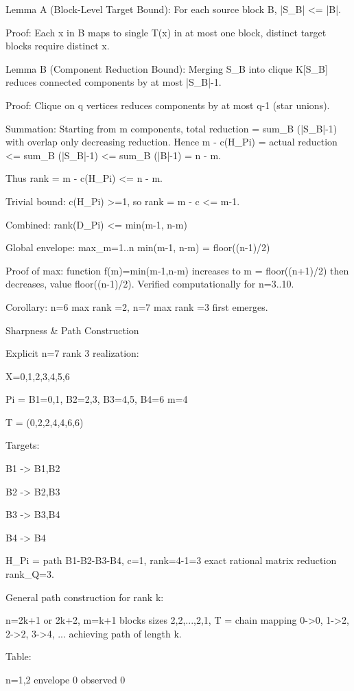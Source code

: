 Lemma A (Block-Level Target Bound): For each source block B, |S_B| <= |B|.

Proof: Each x in B maps to single T(x) in at most one block, distinct target blocks require distinct x.


Lemma B (Component Reduction Bound): Merging S_B into clique K[S_B] reduces connected components by at most |S_B|-1.

Proof: Clique on q vertices reduces components by at most q-1 (star unions).


Summation: Starting from m components, total reduction = sum_B (|S_B|-1) with overlap only decreasing reduction. Hence m - c(H_Pi) = actual reduction <= sum_B (|S_B|-1) <= sum_B (|B|-1) = n - m.


Thus rank = m - c(H_Pi) <= n - m.


Trivial bound: c(H_Pi) >=1, so rank = m - c <= m-1.


Combined: rank(D_Pi) <= min(m-1, n-m)


Global envelope: max_{m=1..n} min(m-1, n-m) = floor((n-1)/2)


Proof of max: function f(m)=min(m-1,n-m) increases to m = floor((n+1)/2) then decreases, value floor((n-1)/2). Verified computationally for n=3..10.


Corollary: n=6 max rank =2, n=7 max rank =3 first emerges.




Sharpness & Path Construction

Explicit n=7 rank 3 realization:




X={0,1,2,3,4,5,6}

Pi = {B1={0,1}, B2={2,3}, B3={4,5}, B4={6}} m=4

T = (0,2,2,4,4,6,6)


Targets:

B1 -> {B1,B2}

B2 -> {B2,B3}

B3 -> {B3,B4}

B4 -> {B4}


H_Pi = path B1-B2-B3-B4, c=1, rank=4-1=3 exact rational matrix reduction rank_Q=3.


General path construction for rank k:

n=2k+1 or 2k+2, m=k+1 blocks sizes 2,2,...,2,1, T = chain mapping 0->0, 1->2, 2->2, 3->4, ... achieving path of length k.


Table:

n=1,2 envelope 0 observed 0

